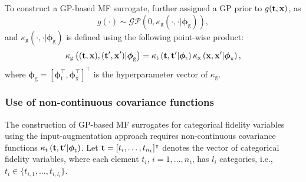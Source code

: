 \documentclass[iicol,sn-basic]{sn-jnl}%
\begin{document}
To construct a GP-based MF surrogate, \cite{Kandasamy2017} further assigned a GP prior to $g({\bf t},{\bf x})$, as
\begin{equation}\label{Eq34}
	g(\cdot) \sim \mathcal{GP}\left(0,\kappa_\text{g}\left(\cdot,\cdot|{\boldsymbol \phi}_\text{g}\right)\right),
\end{equation}
and $\kappa_\text{g}\left(\cdot,\cdot|{\boldsymbol \phi}_\text{g}\right)$ is defined using the following point-wise product:
\begin{equation}\label{Eq35}
	\kappa_\text{g}\left(({\bf t},{\bf x}),({\bf t}',{\bf x}')|{\boldsymbol \phi}_\text{g}\right)=\kappa_\text{t}\left({\bf t},{\bf t}'|{\boldsymbol \phi}_\text{t}\right) \kappa_\text{x}\left({\bf x},{\bf x}'|{\boldsymbol \phi}_\text{x}\right),
\end{equation}
where ${\boldsymbol \phi}_\text{g} = [{\boldsymbol \phi}_\text{t}^\intercal,{\boldsymbol \phi}_\text{x}^\intercal]^\intercal$ is the hyperparameter vector of $\kappa_\text{g}$. 

\subsubsection{Use of non-continuous covariance functions}\label{Sec462}

The construction of GP-based MF surrogates for categorical fidelity variables using the input-augmentation approach requires non-continuous covariance functions $\kappa_\text{t}\left({\bf t},{\bf t}'|{\boldsymbol \phi}_\text{t}\right)$.
Let ${\bf t}=[t_i,\dots,t_{n_\text{t}}]^\intercal$ denotes the vector of categorical fidelity variables, where each element $t_i$, $i=1,\dots,n_\text{t}$, has $l_i$ categories, i.e., $t_i \in \{t_{i,1},\dots,t_{i,l_i}\}$.
\end{document}
